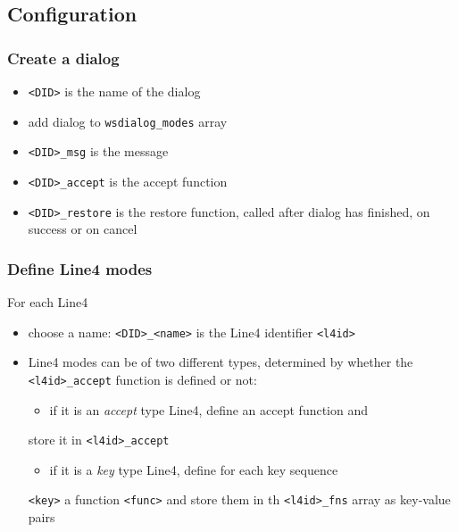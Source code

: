 \documentclass[11pt]{article}
\begin{document}
\subsection{Configuration}
\label{sec-1-5}
\subsubsection{Create a dialog}
\label{sec-1-5-1}
\begin{itemize}
\item \verb~<DID>~ is the name of the dialog
\item add dialog to \verb~wsdialog_modes~ array
\item \verb~<DID>_msg~ is the message
\item \verb~<DID>_accept~ is the accept function
\item \verb~<DID>_restore~ is the restore function, called after dialog has
finished, on success or on cancel
\end{itemize}

\subsubsection{Define Line4 modes}
\label{sec-1-5-2}
For each Line4
\begin{itemize}
\item choose a name: \verb~<DID>_<name>~ is the Line4 identifier \verb~<l4id>~
\item Line4 modes can be of two different types, determined by whether
the \verb~<l4id>_accept~ function is defined or not:
\begin{itemize}
\item if it is an \emph{accept} type Line4, define an accept function and
\end{itemize}
store it in \verb~<l4id>_accept~
\begin{itemize}
\item if it is a \emph{key} type Line4, define for each key sequence
\end{itemize}
\verb~<key>~ a function \verb~<func>~ and store them in th \verb~<l4id>_fns~ array
as key-value pairs
\end{itemize}
\end{document}
